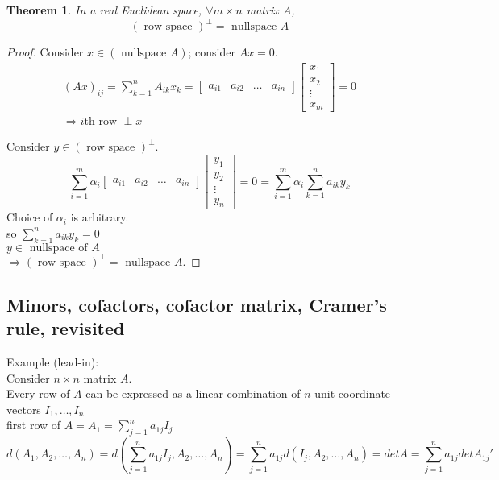 \documentclass[twoside]{amsart}
\theoremstyle{plain}
\newtheorem{theorem}{Theorem}
\theoremstyle{definition}
\begin{document}
\begin{theorem} In a real Euclidean space, 
$\forall m \times n $ matrix $A$, 
  \begin{equation}
    ( \text{ row space } )^{\perp} = \text{ nullspace } A
    \end{equation}
\end{theorem}
\begin{proof}
Consider $x \in ( \text{ nullspace } A)$; consider $Ax=0 $.  
\begin{gather*}
(Ax)_{ij} = \sum_{k=1}^n A_{ik}x_k = \left[ \begin{matrix} a_{i1} & a_{i2} & \dots & a_{in} \end{matrix} \right] \left[ \begin{matrix} x_1 \\ x_2 \\ \vdots \\ x_m \end{matrix} \right] = 0 \\
  \Longrightarrow i\text{th row } \perp x 
\end{gather*}

Consider $y \in (\text{ row space } )^{\perp}$.  
\[
\sum_{i=1}^m \alpha_i \left[ \begin{matrix} a_{i1} & a_{i2} & \dots & a_{in} \end{matrix} \right] \left[ \begin{matrix} y_1 \\ y_2 \\ \vdots \\ y_n \end{matrix} \right] = 0 = \sum_{i=1}^m \alpha_i \sum_{k=1}^n a_{ik} y_k 
\]
\phantom{Consi} Choice of $\alpha_i$ is arbitrary.  \\
\phantom{Consi} so $\sum_{k=1}^n a_{ik}y_k =0 $ \\
\phantom{Consider} $ y\in \text{ nullspace of } A$ \\
$\Longrightarrow (\text{ row space })^{\perp} = \text{ nullspace } A$.  
\end{proof}

\subsection{ Minors, cofactors, cofactor matrix, Cramer's rule, revisited }

Example (lead-in): \\
Consider $n\times n$ matrix $A$.  \\
Every row of $A$ can be expressed as a linear combination of $n$ unit coordinate vectors $I_1,\dots, I_n$ \\
\quad first row of $A = A_1 = \sum_{j=1}^n a_{1j} I_j$ 
\[
d(A_1,A_2, \dots, A_n) = d( \sum_{j=1}^n a_{1j} I_j, A_2, \dots, A_n ) = \sum_{j=1}^n a_{1j} d(I_j, A_2, \dots, A_n) = det{A} = \sum_{j=1}^n a_{1j} det{A_{1j}' }
\]
\end{document}
